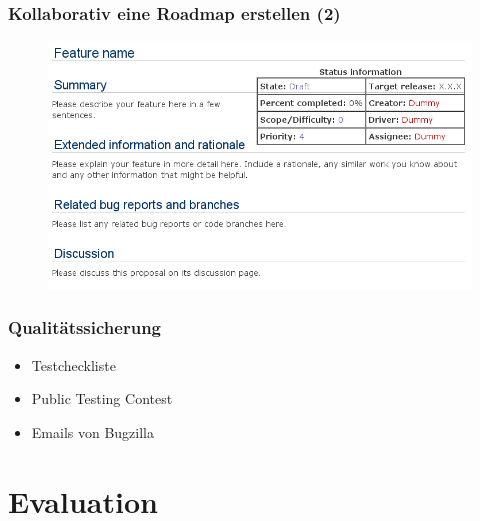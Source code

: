 \documentclass{beamer}
\begin{document}
\begin{frame}
\frametitle{Kollaborativ eine Roadmap erstellen (2)}
\begin{figure}
 \includegraphics[scale=0.45,keepaspectratio=true]{./FeatureProposalTemplateAmarok.png}
\end{figure}
\end{frame}

\begin{frame}
\frametitle{Qualit\"atssicherung}
\begin{itemize}
 \item Testcheckliste
 \item Public Testing Contest
 \item Emails von Bugzilla
\end{itemize}
\end{frame}

\section{Evaluation}
\end{document}

